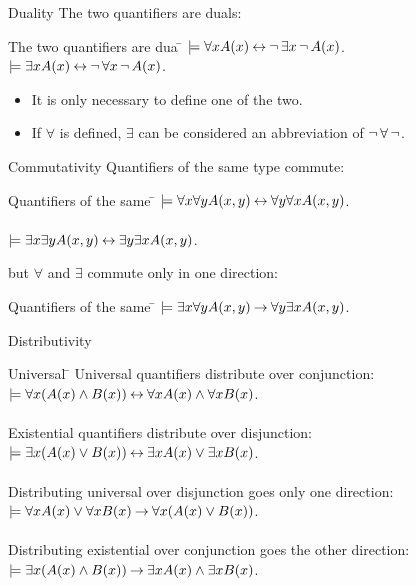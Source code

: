 \documentclass[style=sailor,size=12pt]{powerdot}
\begin{document}
\begin{wideslide}[bm=,toc=]{Duality}
The two quantifiers are duals:
\begin{tabbing}
The two quantifiers are dua \= \kill
\> $\models \forall x A(x) \mathbin{\leftrightarrow} \mathop{\neg} \exists x \mathop{\neg} A(x)$.\\
\> $\models \exists x A(x) \mathbin{\leftrightarrow} \mathop{\neg} \forall x \mathop{\neg} A(x)$.
\end{tabbing}
\begin{itemize}
\item It is only necessary to define one of the two.
\item If $\forall$ is defined, $\exists$ can be considered an abbreviation of
      $\mathop{\neg} \forall \mathop{\neg}$.
\end{itemize}

\end{wideslide}

\begin{wideslide}[bm=,toc=]{Commutativity}
Quantifiers of the same type commute:
\begin{tabbing}
Quantifiers of the same \= \kill
\> $\models \forall x \forall y A(x,y) \mathbin{\leftrightarrow} \forall y \forall x A(x,y)$.\\
\> ~\\ 
\> $\models \exists x \exists y A(x,y) \mathbin{\leftrightarrow} \exists y \exists x A(x,y)$.\\
\end{tabbing}

but $\forall$ and $\exists$ commute only in one direction:
\begin{tabbing}
Quantifiers of the same \= \kill
\> $\models \exists x \forall y A(x,y) \mathbin{\rightarrow} \forall y \exists x A(x,y)$.\\
\end{tabbing}

\end{wideslide}

\begin{wideslide}[bm=,toc=]{Distributivity}
\begin{tabbing}
Universal \= \kill
Universal quantifiers distribute over conjunction:  \> \\
\>$\models \forall x(A(x) \land B(x)) \mathbin{\leftrightarrow} \forall x A(x) \land \forall x B(x)$.\\
~\\
Existential quantifiers distribute over disjunction:\\
\>$\models \exists x(A(x) \lor B(x)) \mathbin{\leftrightarrow} \exists x A(x) \lor \exists x B(x)$.\\
~\\
Distributing universal over disjunction goes only one direction:\\
\>$\models \forall x A(x) \lor \forall x B(x) \mathbin{\rightarrow} \forall x(A(x) \lor B(x))$.\\
~\\
Distributing existential over conjunction goes the other direction:\\
\>$\models \exists x(A(x) \land B(x)) \mathbin{\rightarrow} \exists x A(x) \land \exists x B(x)$.\\
\end{tabbing}

\end{wideslide}
\end{document}
